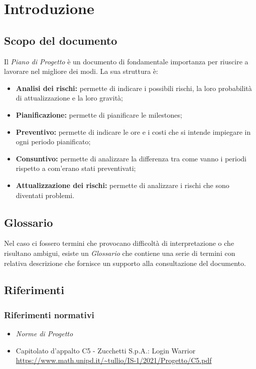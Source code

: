 \chapter{Introduzione}

\section{Scopo del documento}

Il \textit{Piano di Progetto} è un documento di fondamentale importanza per riuscire a lavorare nel migliore dei
modi. La sua struttura è:
\begin{itemize}
    \item \textbf{Analisi dei rischi: } permette di indicare i possibili rischi, la loro probabilità di attualizzazione e la loro gravità;
    \item \textbf{Pianificazione: } permette di pianificare le milestones;
    \item \textbf{Preventivo: } permette di indicare le ore e i costi che si intende impiegare in ogni periodo pianificato;
    \item \textbf{Consuntivo: } permette di analizzare la differenza tra come vanno i periodi rispetto a com'erano stati preventivati;
    \item \textbf{Attualizzazione dei rischi: } permette di analizzare i rischi che sono diventati problemi. 
\end{itemize}

\section{Glossario}

Nel caso ci fossero termini che provocano difficoltà di interpretazione o che risultano ambigui, esiste un \textit{Glossario}
che contiene una serie di termini con relativa descrizione che fornisce un supporto alla consultazione del documento.

\section{Riferimenti}
\subsection{Riferimenti normativi}
\begin{itemize}
  \item \textit{Norme di Progetto}
  \item Capitolato d'appalto C5 - Zucchetti S.p.A.: Login Warrior \\
  \url{https://www.math.unipd.it/~tullio/IS-1/2021/Progetto/C5.pdf}
\end{itemize}

